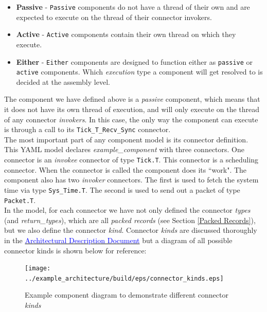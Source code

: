 \vspace{5mm} %
\begin{itemize}
  \item \textbf{Passive} - \texttt{Passive} components do not have a thread of their own and are expected to execute on the thread of their connector invokers.
  \item \textbf{Active} - \texttt{Active} components contain their own thread on which they execute.
  \item \textbf{Either} - \texttt{Either} components are designed to function either as \texttt{passive} or \texttt{active} components. Which \textit{execution} type a component will get resolved to is decided at the assembly level.
\end{itemize}
\vspace{5mm} %

The component we have defined above is a \textit{passive} component, which means that it does not have its own thread of execution, and will only execute on the thread of any connector \textit{invokers}. In this case, the only way the component can execute is through a call to its \texttt{Tick\_T\_Recv\_Sync} connector. \\

The most important part of any component model is its connector definition. This YAML model declares \textit{example\_component} with three connectors. One connector is an \textit{invokee} connector of type \texttt{Tick.T}. This connector is a scheduling connector. When the connector is called the component does its ``work". The component also has two \textit{invoker} connectors. The first is used to fetch the system time via type \texttt{Sys\_Time.T}. The second is used to send out a packet of type \texttt{Packet.T}. \\

In the model, for each connector we have not only defined the connector \textit{types} (and \textit{return\_types}), which are all \textit{packed records} (see Section \ref{Packed Records}), but we also define the connector \textit{kind}. Connector \textit{kinds} are discussed thoroughly in the \href{https://github.com/lasp/adamant/blob/main/doc/architecture_description_document/architecture_description_document.pdf}{\textcolor{blue}{Architectural Description Document}} but a diagram of all possible connector kinds is shown below for reference:

\vspace{5mm} %
\begin{figure}[H]
  \texttt{[image: ../example\_architecture/build/eps/connector\_kinds.eps]}
  \caption{Example component diagram to demonstrate different connector \textit{kinds}}
\end{figure}
\vspace{5mm} %

